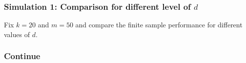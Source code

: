 \documentclass{beamer}
\begin{document}
\begin{frame}
    \frametitle{Simulation 1: Comparison for different level of $d$}
    Fix $k=20$ and $m=50$ and compare the finite sample performance for different values of $d$.
    \begin{figure}[htbp]
        \centering
    \end{figure}
\end{frame}

\begin{frame}
    \frametitle{Continue}
    \begin{figure}[htbp]
        \centering
    \end{figure}
\end{frame}
\end{document}
